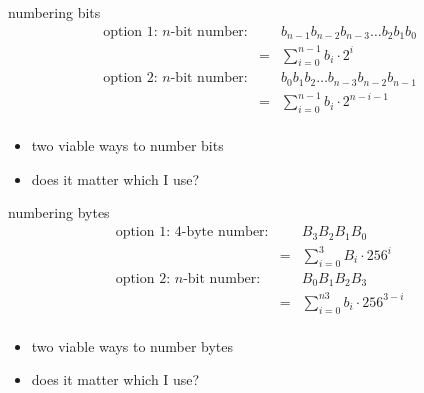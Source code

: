 
\begin{frame}{numbering bits}
\begin{eqnarray*}
\text{option 1: $n$-bit number:}&\;&b_{n-1}b_{n-2}b_{n-3}\ldots b_2b_1b_0 \\
    & = & \sum_{i=0}^{n-1} b_i \cdot 2^i \\
\text{option 2: $n$-bit number:}&\;&b_{0}b_{1}b_{2}\ldots b_{n-3}b_{n-2}b_{n-1} \\
    & = & \sum_{i=0}^{n-1} b_i \cdot 2^{n-i-1} \\
\end{eqnarray*}
\begin{itemize}
\item<2-> two viable ways to number bits
\item<3-> does it matter which I use?
\end{itemize}
\end{frame}

\begin{frame}{numbering bytes}
\begin{eqnarray*}
\text{option 1: 4-byte number:}&\;&B_3B_2B_1B_0 \\
    & = & \sum_{i=0}^{3} B_i \cdot 256^i \\
\text{option 2: $n$-bit number:}&\;&B_0B_1B_2B_3 \\
    & = & \sum_{i=0}^{n3} b_i \cdot 256^{3-i} \\
\end{eqnarray*}
\begin{itemize}
\item<2-> two viable ways to number bytes
\item<3-> does it matter which I use?
\end{itemize}
\end{frame}

